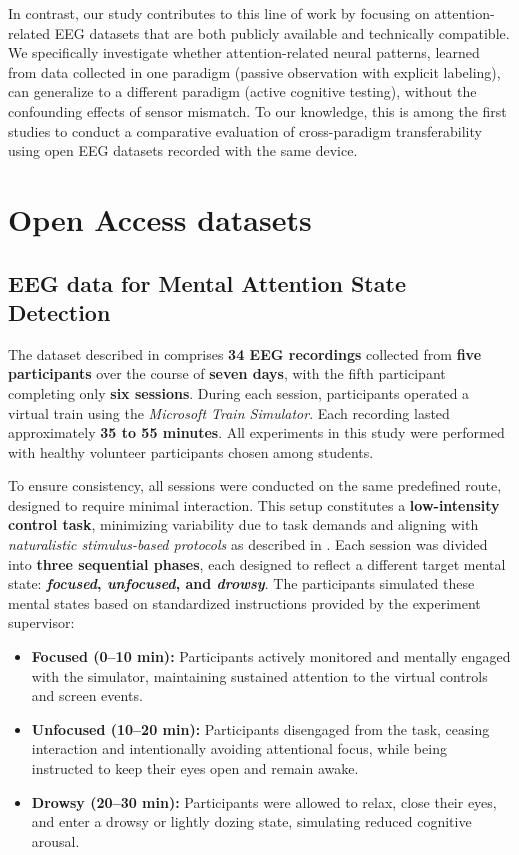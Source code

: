 \documentclass[utf8]{FrontiersinHarvard} %
\begin{document}
In contrast, our study contributes to this line of work by focusing on attention-related EEG datasets that are both publicly available and technically compatible. We specifically investigate whether attention-related neural patterns, learned from data collected in one paradigm (passive observation with explicit labeling), can generalize to a different paradigm (active cognitive testing), without the confounding effects of sensor mismatch. To our knowledge, this is among the first studies to conduct a comparative evaluation of cross-paradigm transferability using open EEG datasets recorded with the same device.


\section{Open Access datasets}

\subsection{EEG data for Mental Attention State Detection}
The dataset described in \cite{aci2019attention} comprises \textbf{34 EEG recordings} collected from \textbf{five participants} over the course of \textbf{seven days}, with the fifth participant completing only \textbf{six sessions}. During each session, participants operated a virtual train using the \textit{Microsoft Train Simulator}. Each recording lasted approximately \textbf{35 to 55 minutes}. All experiments in this study were performed with healthy volunteer participants chosen among students. 

To ensure consistency, all sessions were conducted on the same predefined route, designed to require minimal interaction. This setup constitutes a \textbf{low-intensity control task}, minimizing variability due to task demands and aligning with \textit{naturalistic stimulus-based protocols} as described in \cite{chen2025hybrid}. Each session was divided into \textbf{three sequential phases}, each designed to reflect a different target mental state: \textbf{\textit{focused}, \textit{unfocused}, and \textit{drowsy}}. The participants simulated these mental states based on standardized instructions provided by the experiment supervisor:






\begin{itemize}
  \item \textbf{Focused (0--10 min):} Participants actively monitored and mentally engaged with the simulator, maintaining sustained attention to the virtual controls and screen events.
  \item \textbf{Unfocused (10--20 min):} Participants disengaged from the task, ceasing interaction and intentionally avoiding attentional focus, while being instructed to keep their eyes open and remain awake.
  \item \textbf{Drowsy (20--30 min):} Participants were allowed to relax, close their eyes, and enter a drowsy or lightly dozing state, simulating reduced cognitive arousal.
\end{itemize}
\end{document}
